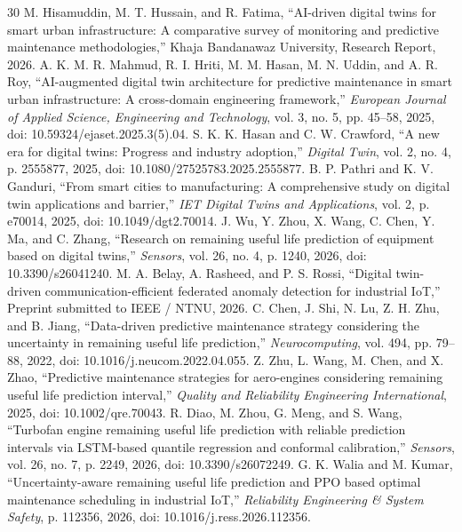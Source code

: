 \documentclass[12pt,a4paper]{article}
\begin{document}
\begin{thebibliography}{30}
 M. Hisamuddin, M. T. Hussain, and R. Fatima, ``AI-driven digital twins for smart urban infrastructure: A comparative survey of monitoring and predictive maintenance methodologies,'' Khaja Bandanawaz University, Research Report, 2026.
 A. K. M. R. Mahmud, R. I. Hriti, M. M. Hasan, M. N. Uddin, and A. R. Roy, ``AI-augmented digital twin architecture for predictive maintenance in smart urban infrastructure: A cross-domain engineering framework,'' \textit{European Journal of Applied Science, Engineering and Technology}, vol. 3, no. 5, pp. 45--58, 2025, doi: 10.59324/ejaset.2025.3(5).04.
 S. K. K. Hasan and C. W. Crawford, ``A new era for digital twins: Progress and industry adoption,'' \textit{Digital Twin}, vol. 2, no. 4, p. 2555877, 2025, doi: 10.1080/27525783.2025.2555877.
 B. P. Pathri and K. V. Ganduri, ``From smart cities to manufacturing: A comprehensive study on digital twin applications and barrier,'' \textit{IET Digital Twins and Applications}, vol. 2, p. e70014, 2025, doi: 10.1049/dgt2.70014.
 J. Wu, Y. Zhou, X. Wang, C. Chen, Y. Ma, and C. Zhang, ``Research on remaining useful life prediction of equipment based on digital twins,'' \textit{Sensors}, vol. 26, no. 4, p. 1240, 2026, doi: 10.3390/s26041240.
 M. A. Belay, A. Rasheed, and P. S. Rossi, ``Digital twin-driven communication-efficient federated anomaly detection for industrial IoT,'' Preprint submitted to IEEE / NTNU, 2026.
 C. Chen, J. Shi, N. Lu, Z. H. Zhu, and B. Jiang, ``Data-driven predictive maintenance strategy considering the uncertainty in remaining useful life prediction,'' \textit{Neurocomputing}, vol. 494, pp. 79--88, 2022, doi: 10.1016/j.neucom.2022.04.055.
 Z. Zhu, L. Wang, M. Chen, and X. Zhao, ``Predictive maintenance strategies for aero-engines considering remaining useful life prediction interval,'' \textit{Quality and Reliability Engineering International}, 2025, doi: 10.1002/qre.70043.
 R. Diao, M. Zhou, G. Meng, and S. Wang, ``Turbofan engine remaining useful life prediction with reliable prediction intervals via LSTM-based quantile regression and conformal calibration,'' \textit{Sensors}, vol. 26, no. 7, p. 2249, 2026, doi: 10.3390/s26072249.
 G. K. Walia and M. Kumar, ``Uncertainty-aware remaining useful life prediction and PPO based optimal maintenance scheduling in industrial IoT,'' \textit{Reliability Engineering \& System Safety}, p. 112356, 2026, doi: 10.1016/j.ress.2026.112356.

\end{thebibliography}
\end{document}
